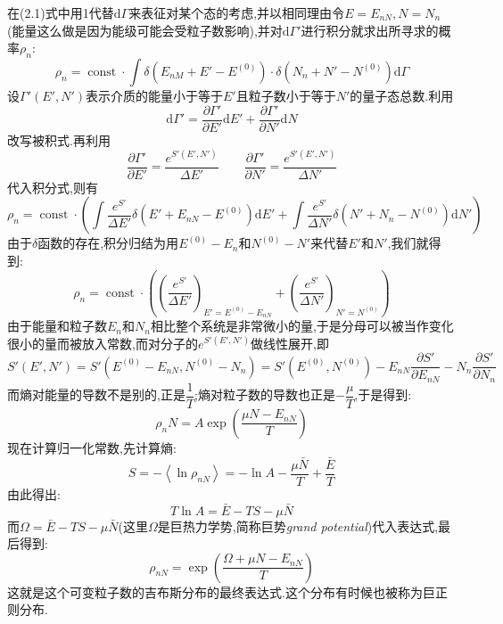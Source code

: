 在(2.1)式中用1代替$\mathrm{d} \Gamma$来表征对某个态的考虑,并以相同理由令$E=E_{nN},N=N_n$(能量这么做是因为能级可能会受粒子数影响),并对$\mathrm{d} \Gamma'$进行积分就求出所寻求的概率$\rho_n$:
\begin{equation}
  \rho_n=\operatorname{const}\cdot \int \delta(E_{nM}+E'-E^{(0)})\cdot \delta(N_n+N'-N^{(0)})\mathrm{d}\Gamma
\end{equation}
设$\Gamma'(E',N')$表示介质的能量小于等于$E'$且粒子数小于等于$N'$的量子态总数.利用
\[\mathrm{d} \Gamma'=\dfrac{\partial \Gamma'}{\partial E'}\mathrm{d} E'+\dfrac{\partial \Gamma'}{\partial N'}\mathrm{d} N\]
改写被积式.再利用
\[\dfrac{\partial \Gamma'}{\partial E'}=\dfrac{e^{S'(E',N')}}{\Delta E'}\qquad\dfrac{\partial \Gamma'}{\partial N'}=\dfrac{e^{S'(E',N')}}{\Delta N'}\]
代入积分式,则有
\begin{equation}
  \rho_n=\operatorname{const}\cdot\left( \int\dfrac{e^{S'}}{\Delta E'}\delta(E'+E_{nN}-E^{(0)})\mathrm{d} E'+\int\dfrac{e^{S'}}{\Delta N'}\delta(N'+N_n-N^{(0)})\mathrm{d} N' \right) 
\end{equation}
由于$\delta$函数的存在,积分归结为用$E^{(0)}-E_n$和$N^{(0)}-N'$来代替$E'$和$N'$,我们就得到:
\begin{equation}
  \rho_n=\operatorname{const}\cdot\left( \left( \dfrac{e^{S'}}{\Delta E'} \right) _{E'=E^{(0)}-E_{nN}}+\left( \dfrac{e^{S'}}{\Delta N'} \right) _{N'=N^{(0)}} \right) 
\end{equation}
由于能量和粒子数$E_n$和$N_n$相比整个系统是非常微小的量,于是分母可以被当作变化很小的量而被放入常数,而对分子的$e^{S'(E',N')}$做线性展开,即
\begin{equation}
    S'(E',N')=S'(E^{(0)}-E_{nN},N^{(0)}-N_n)=S'(E^{(0)},N^{(0)})-E_{nN} \dfrac{\partial S'}{\partial E_{nN}}-N_n\dfrac{\partial S'}{\partial N_n}
\end{equation}
而熵对能量的导数不是别的,正是$\dfrac{1}{T}$;熵对粒子数的导数也正是$-\dfrac{\mu}{T}$,于是得到:
\begin{equation}
    \rho_nN=A\exp(\dfrac{\mu N-E_{nN}}{T})
\end{equation}
现在计算归一化常数,先计算熵:
\[S=- \left< \ln\rho_{nN} \right> =-\ln A -\dfrac{\mu \bar{N}}{T}+\dfrac{\bar{E}}{T} \]
由此得出:
\[T \ln A= \bar{E} - TS - \mu \bar{N}\]
而$\Omega=\bar{E}-TS -\mu \bar{N}$(这里$\Omega$是巨热力学势,简称巨势\emph{grand potential})代入表达式,最后得到:
\begin{equation}
  \rho_{nN}=\exp(\dfrac{\Omega +\mu N -E_{nN}}{T})
\end{equation}
这就是这个可变粒子数的吉布斯分布的最终表达式.这个分布有时候也被称为巨正则分布.

